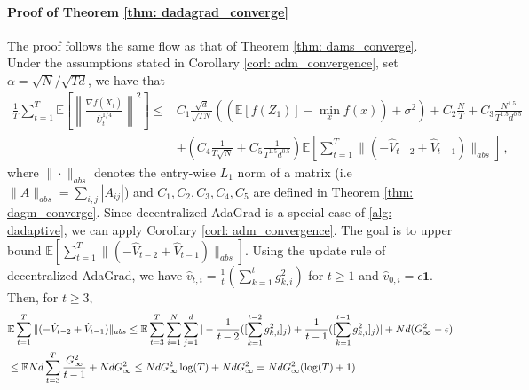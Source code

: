 \documentclass[anon,12pt]{colt2021} %
\begin{document}
\paragraph{Proof of Theorem \ref{thm: dadagrad_converge}} 
The proof follows the same flow as that of Theorem \ref{thm: dams_converge}. 
Under the assumptions stated in Corollary \ref{corl: adm_convergence}, set $\alpha = \sqrt{N}/\sqrt{Td}$, we have that
\begin{align}\label{eq: rep_thm1bis}
	 \frac{1}{T}\sum_{t=1}^T  \mathbb E \left [\left\|\frac{\nabla f( \overline X_{t})}{\overline U_{t}^{1/4}}\right\|^2  \right] 
	\leq  & C_1 \frac{\sqrt{d}}{\sqrt{TN}} \left(( \mathbb E  [f( Z_{1})]  -  \min_x  f(x)) +    \sigma^2 \right)  +  C_2 \frac{N}{T}  +  C_3 \frac{N^{1.5}}{T^{1.5}d^{0.5}} 
	\nonumber \\
    &+  \left(C_4 \frac{1}{T\sqrt{N}} +  C_5   \frac{1}{T^{1.5}d^{0.5}}\right) 
\mathbb E \left[ \sum_{t=1}^{T}   \|    (- \hat V_{t-2} + \hat V_{t-1} ) \|_{abs} \right]  \, ,
\end{align}
where $\| \cdot\|_{abs}$  denotes the entry-wise $L_1$ norm of a matrix (i.e $\| A\|_{abs} = \sum_{i,j}{|A_{ij}|}$) and $C_1, C_2 ,C_3, C_4, C_5$ are defined in Theorem \ref{thm: dagm_converge}. 
Since decentralized AdaGrad is a special case of \ref{alg: dadaptive}, we can apply Corollary \ref{corl: adm_convergence}.
The goal is to upper bound $\mathbb E \left[ \sum_{t=1}^{T}   \|    (- \hat V_{t-2} + \hat V_{t-1} ) \|_{abs} \right]$.  
Using the update rule of decentralized AdaGrad, we have $\hat v_{t,i} = \frac{1}{t}( \sum_{k=1}^{t}g_{k,i}^2)$ for $t \geq 1$ and $\hat v_{0,i} = \epsilon \mathbf 1$. 
Then, for $t \geq 3$,
{\small \begin{align}\notag
\begin{split}
&\mathbb E  \sum_{t=1}^{T}   \|    (- \hat V_{t-2} + \hat V_{t-1} ) \|_{abs}  \leq \mathbb E  \sum_{t=3}^{T}  \sum_{i=1}^N \sum_{j=1}^d    |- \frac{1}{t-2}( [\sum_{k=1}^{t-2}g_{k,i}^2]_j) + \frac{1}{t-1}([ \sum_{k=1}^{t-1}g_{k,i}^2]_j )|  + Nd (G_{\infty}^2 - \epsilon)  \\
& \leq  \mathbb E  N d \sum_{t=3}^{T}      \frac{G_{\infty}^2}{t-1}     +  Nd G_{\infty}^2 \leq  Nd G_{\infty}^2 \log (T) +  Nd G_{\infty}^2 =  NdG_{\infty}^2 (\log (T) + 1)
\end{split}
\end{align}
}
\end{document}
